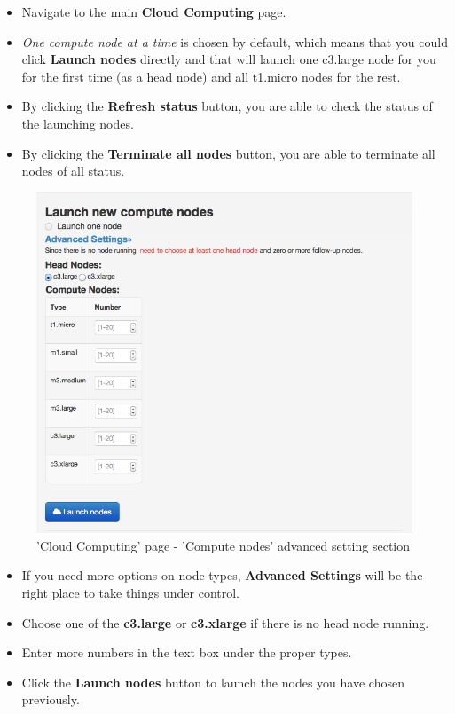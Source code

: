 \begin{itemize}
\item Navigate to the main \textbf{Cloud Computing} page.%
\item \textit{One compute node at a time} is chosen by default, which means that you could click \textbf{Launch nodes} directly and that will launch one c3.large node for you for the first time (as a head node) and all t1.micro nodes for the rest.
\item By clicking the \textbf{Refresh status} button, you are able to check the status of the launching nodes.
\item By clicking the \textbf{Terminate all nodes} button, you are able to terminate all nodes of all status. 

\end{itemize}

\begin{figure}[!ht]
\centering
\includegraphics[scale=0.45]{T6/T6_fig_computenode2.png}
\caption{'Cloud Computing' page - 'Compute nodes' advanced setting section}
\label{fig:2}
\end{figure}

\begin{itemize}
\item If you need more options on node types, \textbf{Advanced Settings} will be the right place to take things under control.
\item Choose one of the \textbf{c3.large} or \textbf{c3.xlarge} if there is no head node running.
\item Enter more numbers in the text box under the proper types.
\item Click the \textbf{Launch nodes} button to launch the nodes you have chosen previously.
\end{itemize}

